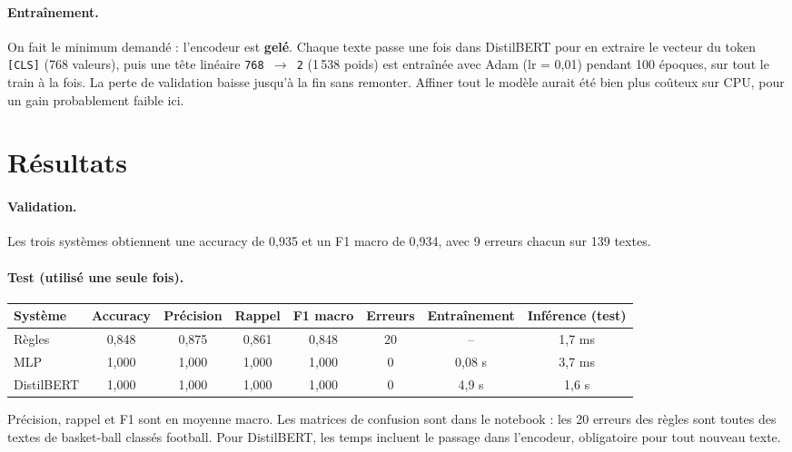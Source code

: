 \documentclass[11pt,a4paper]{article}
\begin{document}
\paragraph{Entraînement.} On fait le minimum demandé : l'encodeur est \textbf{gelé}. Chaque texte passe une fois dans DistilBERT pour en extraire le vecteur du token \texttt{[CLS]} (768 valeurs), puis une tête linéaire \texttt{768 $\to$ 2} (1\,538 poids) est entraînée avec Adam (lr = 0,01) pendant 100 époques, sur tout le train à la fois. La perte de validation baisse jusqu'à la fin sans remonter. Affiner tout le modèle aurait été bien plus coûteux sur CPU, pour un gain probablement faible ici.

\section{Résultats}

\paragraph{Validation.} Les trois systèmes obtiennent une accuracy de 0,935 et un F1 macro de 0,934, avec 9 erreurs chacun sur 139 textes.

\paragraph{Test (utilisé une seule fois).}

\begin{center}
\small
\setlength{\tabcolsep}{4pt}
\begin{tabular}{lccccccc}
\toprule
Système & Accuracy & Précision & Rappel & F1 macro & Erreurs & Entraînement & Inférence (test) \\
\midrule
Règles     & 0,848 & 0,875 & 0,861 & 0,848 & 20 & --      & 1,7 ms \\
MLP        & 1,000 & 1,000 & 1,000 & 1,000 & 0  & 0,08 s  & 3,7 ms \\
DistilBERT & 1,000 & 1,000 & 1,000 & 1,000 & 0  & 4,9 s   & 1,6 s \\
\bottomrule
\end{tabular}
\end{center}

Précision, rappel et F1 sont en moyenne macro. Les matrices de confusion sont dans le notebook : les 20 erreurs des règles sont toutes des textes de basket-ball classés football. Pour DistilBERT, les temps incluent le passage dans l'encodeur, obligatoire pour tout nouveau texte.
\end{document}
